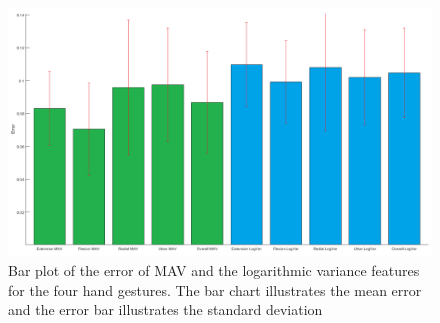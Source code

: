 \begin{figure}[H]
	\includegraphics[width=.7\textwidth]{figures/results/gimmeThemRMSEBars}  %
	\caption{Bar plot of the error of MAV and the logarithmic variance features for the four hand gestures. The bar chart illustrates the mean error and the error bar illustrates the standard deviation}
	\label{fig:gimmeThemRMSEBars}  %
\end{figure}
